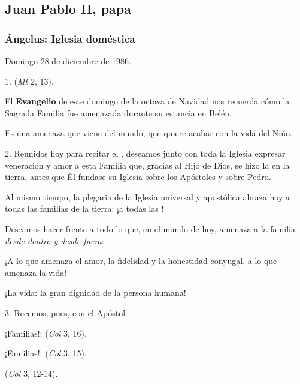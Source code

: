 \subsection{Juan Pablo II, papa}

\subsubsection{Ángelus: Iglesia doméstica}

Domingo 28 de diciembre de 1986.

1.  (\emph{Mt} 2, 13).

El \textbf{Evangelio} de este domingo de la octava de Navidad nos recuerda cómo la Sagrada Familia fue amenazada durante su estancia en Belén.

Es una amenaza que viene del mundo, que quiere acabar con la vida del Niño.

2. Reunidos hoy para recitar el , deseamos junto con toda la Iglesia expresar veneración y amor a esta Familia que, gracias al Hijo de Dios, se hizo la  en la tierra, antes que Él fundase su Iglesia sobre los Apóstoles y sobre Pedro.

Al mismo tiempo, la plegaria de la Iglesia universal y apostólica abraza hoy a todas las familias de la tierra: ¡a todas las !

Deseamos hacer frente a todo lo que, en el mundo de hoy, amenaza a la familia \emph{desde dentro y desde fuera}:

¡A lo que amenaza el amor, la fidelidad y la honestidad conyugal, a lo que amenaza la vida!

¡La vida: la gran dignidad de la persona humana!

3. Recemos, pues, con el Apóstol:

¡Familias!:  (\emph{Col} 3, 16).

¡Familias!:  (\emph{Col} 3, 15).

 (\emph{Col} 3, 12-14).

